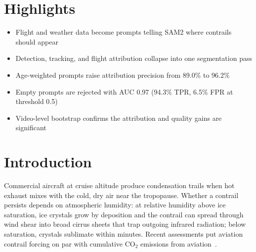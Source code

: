 \documentclass[1p,11pt]{elsarticle}
\begin{document}
\section*{Highlights}
\begin{itemize}
\item Flight and weather data become prompts telling SAM2 where contrails should appear
\item Detection, tracking, and flight attribution collapse into one segmentation pass
\item Age-weighted prompts raise attribution precision from 89.0\% to 96.2\%
\item Empty prompts are rejected with AUC 0.97 (94.3\% TPR, 6.5\% FPR at threshold 0.5)
\item Video-level bootstrap confirms the attribution and quality gains are significant
\end{itemize}

\section{Introduction}

Commercial aircraft at cruise altitude produce condensation trails when hot exhaust mixes with the cold, dry air near the tropopause. Whether a contrail persists depends on atmospheric humidity: at relative humidity above ice saturation, ice crystals grow by deposition and the contrail can spread through wind shear into broad cirrus sheets that trap outgoing infrared radiation; below saturation, crystals sublimate within minutes. Recent assessments put aviation contrail forcing on par with cumulative CO$_2$ emissions from aviation~\cite{lee2021contribution, teoh2023global}.
\end{document}
